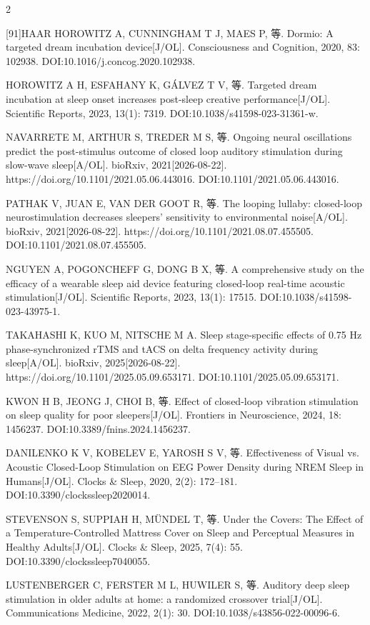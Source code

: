 \documentclass[UTF8,zihao=5,fontset=none]{ctexart}
\begin{document}
\begin{multicols}{2}
{[91]\quad HAAR HOROWITZ A, CUNNINGHAM T J, MAES P, 等. Dormio: A targeted dream incubation device[J/OL]. Consciousness and Cognition, 2020, 83: 102938. DOI:10.1016/j.concog.2020.102938.\par
[92]\quad HOROWITZ A H, ESFAHANY K, GÁLVEZ T V, 等. Targeted dream incubation at sleep onset increases post-sleep creative performance[J/OL]. Scientific Reports, 2023, 13(1): 7319. DOI:10.1038/s41598-023-31361-w.\par
[93]\quad NAVARRETE M, ARTHUR S, TREDER M S, 等. Ongoing neural oscillations predict the post-stimulus outcome of closed loop auditory stimulation during slow-wave sleep[A/OL]. bioRxiv, 2021[2026-08-22]. https://doi.org/10.1101/2021.05.06.443016. DOI:10.1101/2021.05.06.443016.\par
[94]\quad PATHAK V, JUAN E, VAN DER GOOT R, 等. The looping lullaby: closed-loop neurostimulation decreases sleepers’ sensitivity to environmental noise[A/OL]. bioRxiv, 2021[2026-08-22]. https://doi.org/10.1101/2021.08.07.455505. DOI:10.1101/2021.08.07.455505.\par
[95]\quad NGUYEN A, POGONCHEFF G, DONG B X, 等. A comprehensive study on the efficacy of a wearable sleep aid device featuring closed-loop real-time acoustic stimulation[J/OL]. Scientific Reports, 2023, 13(1): 17515. DOI:10.1038/s41598-023-43975-1.\par
[96]\quad TAKAHASHI K, KUO M, NITSCHE M A. Sleep stage-specific effects of 0.75 Hz phase-synchronized rTMS and tACS on delta frequency activity during sleep[A/OL]. bioRxiv, 2025[2026-08-22]. https://doi.org/10.1101/2025.05.09.653171. DOI:10.1101/2025.05.09.653171.\par
[97]\quad KWON H B, JEONG J, CHOI B, 等. Effect of closed-loop vibration stimulation on sleep quality for poor sleepers[J/OL]. Frontiers in Neuroscience, 2024, 18: 1456237. DOI:10.3389/fnins.2024.1456237.\par
[98]\quad DANILENKO K V, KOBELEV E, YAROSH S V, 等. Effectiveness of Visual vs. Acoustic Closed-Loop Stimulation on EEG Power Density during NREM Sleep in Humans[J/OL]. Clocks \& Sleep, 2020, 2(2): 172--181. DOI:10.3390/clockssleep2020014.\par
[99]\quad STEVENSON S, SUPPIAH H, MÜNDEL T, 等. Under the Covers: The Effect of a Temperature-Controlled Mattress Cover on Sleep and Perceptual Measures in Healthy Adults[J/OL]. Clocks \& Sleep, 2025, 7(4): 55. DOI:10.3390/clockssleep7040055.\par
[100]\quad LUSTENBERGER C, FERSTER M L, HUWILER S, 等. Auditory deep sleep stimulation in older adults at home: a randomized crossover trial[J/OL]. Communications Medicine, 2022, 2(1): 30. DOI:10.1038/s43856-022-00096-6.\par
}
\end{multicols}
\end{document}
